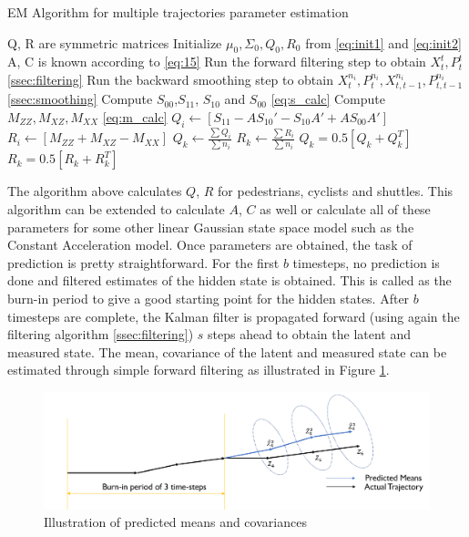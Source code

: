 \documentclass{article}
\begin{document}
\begin{algorithm}[H]
\caption{ EM Algorithm for multiple trajectories parameter estimation}\label{alg:em}
\begin{algorithmic}[1]
\Ensure Q, R are symmetric matrices
\State  Initialize $\mu_0,\Sigma_0, Q_0, R_0$ from \ref{eq:init1} and  \ref{eq:init2}
\State A, C is known according to \ref{eq:15}
            \State Run the forward filtering step to obtain $X_{t}^{t}, P_{t}^t$ \ref{ssec:filtering}
            \State Run the backward smoothing step to obtain  $X_{t}^{n_i}, P_{t}^{n_i}, X_{t,t-1}^{n_i}, P_{t,t-1}^{n_i}$  \ref{ssec:smoothing}
            \State Compute $S_{00}$,$S_{11}$, $S_{10}$ and $S_{00}$ \ref{eq:s_calc}
            \State Compute $M_{ZZ}, M_{XZ}, M_{XX}$ \ref{eq:m_calc}
            \State $Q_i \gets [S_{11}-AS_{10}'-S_{10}A'+AS_{00}A']$ 
            \State $R_i \gets [M_{ZZ}+M_{XZ}-M_{XX}]$
        \EndFor
        \State $Q_k \gets \frac{\sum{Q_i}}{\sum{n_i}}$
        \State $R_k \gets \frac{\sum{R_i}}{\sum{n_i}}$
        \State $Q_k=0.5[Q_k+Q_k^T]$
        \State $R_k=0.5[R_k+R_k^T]$
    \EndWhile
\EndFor
\end{algorithmic}
\end{algorithm}

The algorithm above calculates $Q$, $R$ for pedestrians, cyclists and shuttles. This algorithm can be extended to calculate $A$, $C$ as well or calculate all of these parameters for some other linear Gaussian state space model such as the Constant Acceleration model.  Once parameters are obtained, the task of prediction is pretty straightforward. For the first $b$ timesteps, no prediction is done and filtered estimates of the hidden state is obtained. This is called as the burn-in period to give a good starting point for the hidden states.  After $b$ timesteps are complete, the Kalman filter is propagated forward (using again the filtering algorithm \ref{ssec:filtering}) $s$ steps ahead to obtain the latent and measured state. The mean, covariance of the latent and measured state can be estimated through simple forward filtering as illustrated in Figure \ref{fig:forward_filter}. 

\begin{figure}[H]
\centering
\includegraphics[scale=0.5]{method/cov_prediction.PNG}
\caption{Illustration of predicted means and covariances}
\label{fig:forward_filter}
\end{figure}
\end{document}
